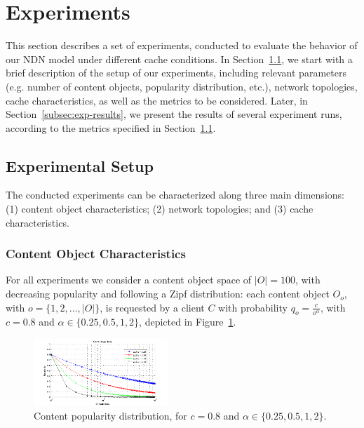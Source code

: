 \section{Experiments}
\label{sec:experiments}

This section describes a set of experiments, conducted to evaluate 
the behavior of our NDN model under different cache conditions. In 
Section~\ref{subsec:exp-setup}, we start 
with a brief description of the setup of our experiments, 
including relevant parameters (e.g. number of content objects, popularity 
distribution, etc.), network topologies, cache characteristics, as well as the 
metrics to be considered. Later, in Section~\ref{subsec:exp-results}, we 
present the results of several experiment runs, according to the metrics 
specified in Section~\ref{subsec:exp-setup}.

\subsection{Experimental Setup}
\label{subsec:exp-setup}

The conducted experiments can be characterized along three main dimensions: (1) 
content object characteristics; (2) network topologies; and (3) cache 
characteristics.\shortvertbreak

\subsubsection{Content Object Characteristics}
\label{subsec:exp-setup-cobj}

For all experiments we consider a content object space of 
$|O| = 100$, with decreasing popularity and following a Zipf distribution: 
each content object $O_o$, with $o = \{1,2,...,|O|\}$, is requested by a client 
$C$ with probability $q_{o} = \frac{c}{o^{\alpha}}$, with $c = 0.8$ and 
$\alpha \in \{0.25, 0.5, 1, 2\}$, depicted in Figure~\ref{fig:zipf}.\shortvertbreak

\begin{figure}[h!]

    \centering
    \includegraphics[width=0.45\textwidth]{figures/pop.png}
    \cprotect\caption{Content popularity distribution, for $c = 0.8$ and 
        $\alpha \in \{0.25, 0.5, 1, 2\}$.}
    \label{fig:zipf}

\end{figure}

